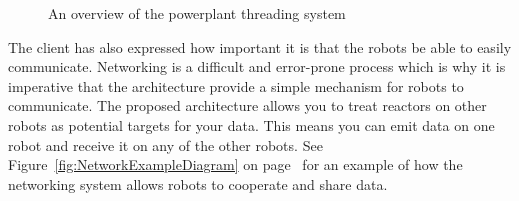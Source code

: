\documentclass[english,12pt]{scrartcl}
\begin{document}
\begin{landscape}
\begin{figure}[b]
				\caption {An overview of the \gls{powerplant} threading system}
				\label{fig:PowerPlantThreadingOverviewDiagram}
			\end{figure}
			\end{landscape}

			The client has also expressed how important it is that the robots be able to easily communicate.
			Networking is a difficult and error-prone process which is why it is imperative that the architecture provide a simple mechanism for robots to communicate.
			The proposed architecture allows you to treat \glspl{reactor} on other robots as potential targets for your data.
			This means you can emit data on one robot and receive it on any of the other robots.
			See Figure~\ref{fig:NetworkExampleDiagram} on page~\pageref{fig:NetworkExampleDiagram} for an example of how the networking system allows robots to cooperate and share data.
\end{document}
